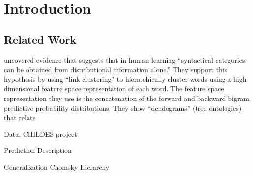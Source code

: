 \section{Introduction}

\subsection{Related Work}
\citet{Redington1998} uncovered evidence that suggests that in human learning ``syntactical categories can be obtained from distributional information alone.''  They support this hypothesis by using ``link clustering'' to hierarchically cluster words using a high dimensional feature space representation of each word.  The feature space representation they use is the concatenation of the forward and backward bigram predictive probability distributions.   They show ``dendograms'' (tree ontologies) that relate 

Data, CHILDES project \cite{MacWhinney2000}

Prediction
Description

Generalization
Chomsky Hierarchy
